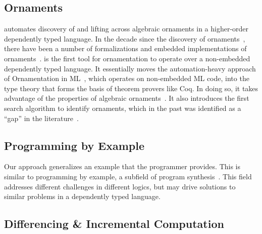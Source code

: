 


\subsection*{Ornaments}


\toolnameb automates discovery of and lifting across algebraic ornaments in a higher-order dependently typed language.
In the decade since the discovery of ornaments~\cite{mcbride}, there have been a number
of formalizations and embedded implementations of ornaments~\cite{Dagand:2013:CTO:2591370.2591396, ko2013relational, dagand2014transporting, ko2016programming, dagand2017essence}.
\toolnameb is the first tool for ornamentation to operate over a non-embedded dependently typed language.
It essentially moves the automation-heavy approach of Ornamentation in ML~\cite{Williams2017},
which operates on non-embedded ML code, into the type theory that forms the basis of theorem provers like Coq. 
In doing so, it takes advantage of the properties of algebraic ornaments~\cite{mcbride}.
It also introduces the first search algorithm to identify ornaments, which in the past 
was identified as a ``gap'' in the literature~\cite{ko2016programming}.

\subsection*{Programming by Example}


Our approach generalizes an example that the programmer provides.
This is similar to programming by example, a subfield of 
program synthesis~\cite{DBLP:journals/ftpl/GulwaniPS17}. 
This field addresses different challenges in different logics,
but may drive solutions to similar problems in a dependently typed language.

\subsection*{Differencing \& Incremental Computation}


